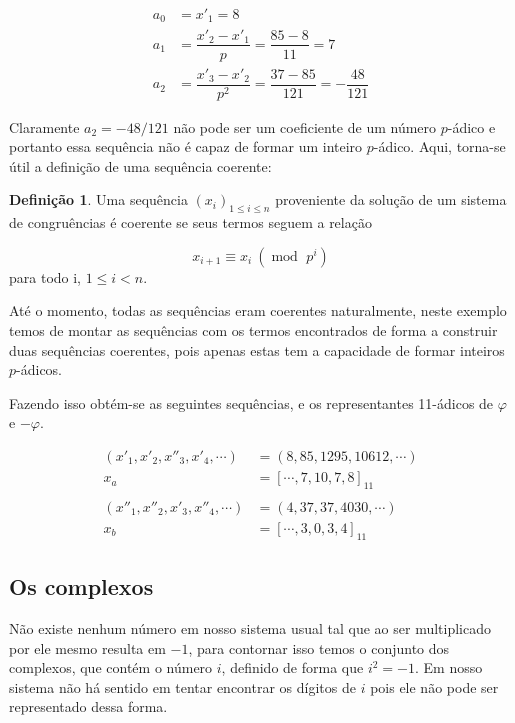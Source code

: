 \documentclass{report}
\newcommand*{\padc}[2]{\left[#1\right]_{#2}}
\DeclareMathOperator{\modulo}{mod \ }
\theoremstyle{definition}
\newtheorem{definition}{Definição}[section]
\begin{document}
\begin{align*}
    a_0 &= x'_1 = 8 \\
    a_1 &= \dfrac{x'_2-x'_1}{p} = \dfrac{85-8}{11} = 7 \\
    a_2 &= \dfrac{x'_3-x'_2}{p^2} = \dfrac{37-85}{121} = -\dfrac{48}{121}
\end{align*}

Claramente $a_2 = -48/121$ não pode ser um coeficiente de um número $p$-ádico e portanto essa sequência não é capaz de formar um inteiro $p$-ádico. Aqui, torna-se útil a definição de uma sequência coerente:

\begin{definition}
    Uma sequência $\left( x_i \right)_{1 \leq i \leq n}$ proveniente da solução de um sistema de congruências é coerente se seus termos seguem a relação

    \begin{equation*}
        x_{i+1} \equiv x_i \ (\modulo p^i)
    \end{equation*}
    para todo i, $1 \leq i < n$.
\end{definition}

Até o momento, todas as sequências eram coerentes naturalmente, neste exemplo temos de montar as sequências com os termos encontrados de forma a construir duas sequências coerentes, pois apenas estas tem a capacidade de formar inteiros $p$-ádicos.

Fazendo isso obtém-se as seguintes sequências, e os representantes 11-ádicos de $\varphi$ e $-\varphi$.

\begin{align*}
    (x'_1, x'_2, x''_3, x'_4, \cdots) &= (8, 85, 1295, 10612, \cdots) \\
     x_a &= \padc{\cdots, 7, 10, 7, 8}{11} \\
    &\\
    (x''_1, x''_2, x'_3, x''_4, \cdots) &= (4, 37, 37, 4030, \cdots) \\
     x_b &= \padc{\cdots, 3, 0, 3, 4}{11}
\end{align*}

\subsection{Os complexos}

Não existe nenhum número em nosso sistema usual tal que ao ser multiplicado por ele mesmo resulta em $-1$, para contornar isso temos o conjunto dos complexos, que contém o número $i$, definido de forma que $i^2 = -1$. Em nosso sistema não há sentido em tentar encontrar os dígitos de $i$ pois ele não pode ser representado dessa forma.
\end{document}
